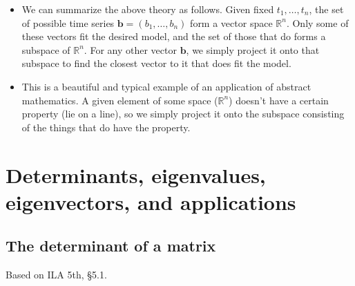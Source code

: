 \documentclass[11pt,oneside]{amsbook}
\newcommand{\RR}{\mathbb R}
\theoremstyle{definition}
\theoremstyle{plain}
\theoremstyle{definition}
\theoremstyle{remark}
\numberwithin{equation}{section}
\numberwithin{figure}{section}
\begin{document}
\begin{itemize}
\begin{itemize}
\[\begin{bmatrix}
      \end{bmatrix}
    \]
  \item We won't solve it, but the outcome is $y=5.8-7.2t+2t^2$.
  \end{itemize}
\item We can summarize the above theory as follows. Given fixed $t_1,\ldots,t_n$, the set of possible time series $\mathbf b=(b_1,\ldots,b_n)$ form a vector space $\RR^n$. Only some of these vectors fit the desired model, and the set of those that do forms a subspace of $\RR^n$. For any other vector $\mathbf b$, we simply project it onto that subspace to find the closest vector to it that does fit the model.
\item This is a beautiful and typical example of an application of abstract mathematics. A given element of some space ($\RR^n$) doesn't have a certain property (lie on a line), so we simply project it onto the subspace consisting of the things that do have the property.
\end{itemize}




\chapter{Determinants, eigenvalues, eigenvectors, and applications}

\section{The determinant of a matrix}

Based on ILA 5th, \S 5.1.
\end{document}
